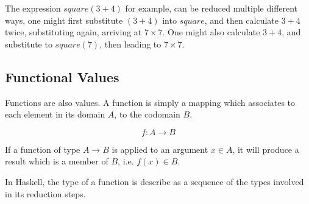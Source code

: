 The expression $square (3+4)$ for example, can be reduced multiple different ways, one might
first substitute $(3+4)$ into $square$, and then calculate $3+4$ twice, substituting again,
arriving at $7\times 7$. One might also calculate $3+4$, and substitute to $square(7)$, 
then leading to $7\times 7$.

\subsection{Functional Values}
Functions are also values. A function is simply a mapping which associates to each element
in its domain $A$, to the codomain $B$.

\begin{equation}
f:A\to B
\end{equation}

If a function of type $A\to B$ is applied to an argument $x\in A$, it will produce a result
which is a member of $B$, i.e. $f(x)\in B$.

In Haskell, the type of a function is describe as a sequence of the types involved in
its reduction steps.
